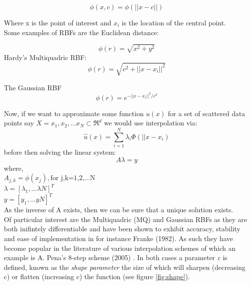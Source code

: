 \documentclass[a4paper]{amsart}
\begin{document}
\begin{equation}
\phi(x,c) = \phi(||x-c||)
\end{equation}

Where x is the point of interest and $x_{i}$ is the location of the central point. \\Some examples of RBFs are the Euclidean distance:

\begin{equation}
\phi(r) = \sqrt{x^{2} + y^{2}}
\end{equation}
Hardy's Multiquadric RBF:
\begin{equation}
\phi(r) = \sqrt{c^{2} + ||x-x_{i}||^{2}}
\end{equation}

The Gaussian RBF
\begin{equation}
\phi(r) = e^{-||x-x_{i}||^{2} / c^{2}}
\end{equation}

Now, if we want to approximate some function $u(x)$ for a set of scattered data points say $X={x_{1},x_{2},...x_{N}} \subset \Re^{d}$ we would use interpolation via:
\begin{equation}
\hat u(x) = \sum^{N}_{i=1} \lambda_{i} \Phi(||x - x_{i})
\label{RBFA}
\end{equation}
before then solving the linear system:
\begin{equation}
A\lambda =y
\end{equation}
where,
\\ $A_{j,k}= \phi(x_{j}), \mbox{for j,k=1,2,...N}$
\\$\lambda=[\lambda_{1},...\lambda{N}]^{T}$
\\$y=[y_{1},...y{N}]^{T}$\\

As the inverse of A exists, then we can be sure that a unique solution exists.\\

Of particular interest are the Multiquadric (MQ) and Gaussian RBFs as they are both inifintely differentiable and have been shown to exhibit accuracy, stability and ease of implementation in for instance Franke (1982)\cite{rbf3}. As such they have become popular in the literature of various interpolation schemes of which an example is A. Pena's 8-step scheme (2005) \cite{rbf6}. In both cases a parameter \emph{c} is defined, known as the \emph{shape parameter} the size of which will sharpen (decreasing c) or flatten (increasing c) the function (see figure \ref{fig:shape}).\\
\end{document}
